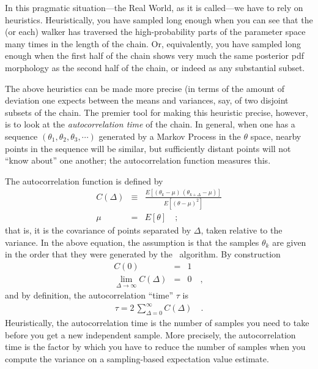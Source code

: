 \documentclass[12pt,twoside,pdftex]{article}
\newcommand{\MCMC}{\acronym{MCMC}}
\newcommand{\pars}{\theta}
\begin{document}
In this pragmatic situation---the Real World, as it is called---we have to rely on heuristics.
Heuristically, you have sampled long enough when you can see
that the (or each) walker has traversed the high-probability parts of
the parameter space many times in the length of the chain.
Or, equivalently, you have sampled long enough when the first half of
the chain shows very much the same posterior pdf morphology as the
second half of the chain, or indeed as any substantial subset.

The above heuristics can be made more precise (in terms of the amount
of deviation one expects between the means and variances, say, of two
disjoint subsets of the chain.
The premier tool for making this heuristic precise, however, is to
look at the \emph{autocorrelation time} of the chain.
In general, when one has a sequence $(\pars_1, \pars_2, \theta_3, \cdots)$
generated by a Markov Process in the $\pars$ space, nearby points in
the sequence will be similar, but sufficiently distant points will not
``know about'' one another;
the autocorrelation function measures this.

The autocorrelation function is defined by
\begin{eqnarray}
C(\Delta) &\equiv& \frac{E[(\pars_k - \mu)\,(\pars_{k+\Delta} - \mu)]}{E[(\pars - \mu)^2]}
\label{eq:autocorrelationfn}\\
\mu &=& E[\pars]
\quad ;
\end{eqnarray}
that is, it is the covariance of points separated by $\Delta$, taken
relative to the variance.
In the above equation, the assumption is that the samples $\pars_k$ are
given in the order that they were generated by the \MCMC\ algorithm.
By construction
\begin{eqnarray}
C(0) &=& 1
\\
\lim_{\Delta\rightarrow\infty} C(\Delta) &=& 0
\quad ,
\end{eqnarray}
and by definition, the autocorrelation ``time'' $\tau$ is
\begin{eqnarray}
\tau = 2\,\sum_{\Delta = 0}^{\infty} C(\Delta)
\label{eq:autocorrelationtime}\quad .
\end{eqnarray}
Heuristically, the autocorrelation time is the number of samples you
need to take before you get a new independent sample.
More precisely, the autocorrelation time is the factor by which you
have to reduce the number of samples when you compute the variance on
a sampling-based expectation value estimate.
\end{document}
